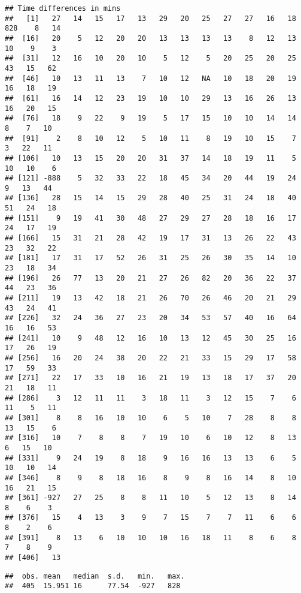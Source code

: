 \documentclass[
]{article}
\begin{document}
\begin{verbatim}
## Time differences in mins
##   [1]   27   14   15   17   13   29   20   25   27   27   16   18  828    8   14
##  [16]   20    5   12   20   20   13   13   13   13    8   12   13   10    9    3
##  [31]   12   16   10   20   10    5   12    5   20   25   20   25   43   15   62
##  [46]   10   13   11   13    7   10   12   NA   10   18   20   19   16   18   19
##  [61]   16   14   12   23   19   10   10   29   13   16   26   13   16   20   15
##  [76]   18    9   22    9   19    5   17   15   10   10   14   14    8    7   10
##  [91]    2    8   10   12    5   10   11    8   19   10   15    7    3   22   11
## [106]   10   13   15   20   20   31   37   14   18   19   11    5   10   10    6
## [121] -888    5   32   33   22   18   45   34   20   44   19   24    9   13   44
## [136]   28   15   14   15   29   28   40   25   31   24   18   40   51   24   18
## [151]    9   19   41   30   48   27   29   27   28   18   16   17   24   17   19
## [166]   15   31   21   28   42   19   17   31   13   26   22   43   23   32   22
## [181]   17   31   17   52   26   31   25   26   30   35   14   10   23   18   34
## [196]   26   77   13   20   21   27   26   82   20   36   22   37   44   23   36
## [211]   19   13   42   18   21   26   70   26   46   20   21   29   43   24   41
## [226]   32   24   36   27   23   20   34   53   57   40   16   64   16   16   53
## [241]   10    9   48   12   16   10   13   12   45   30   25   16   17   26   19
## [256]   16   20   24   38   20   22   21   33   15   29   17   58   17   59   33
## [271]   22   17   33   10   16   21   19   13   18   17   37   20   21   18   11
## [286]    3   12   11   11    3   18   11    3   12   15    7    6   11    5   11
## [301]    8    8   16   10   10    6    5   10    7   28    8    8   13   15    6
## [316]   10    7    8    8    7   19   10    6   10   12    8   13    6   15   10
## [331]    9   24   19    8   18    9   16   16   13   13    6    5   10   10   14
## [346]    8    9    8   18   16    8    9    8   16   14    8   10   16   21   15
## [361] -927   27   25    8    8   11   10    5   12   13    8   14    8    6    3
## [376]   15    4   13    3    9    7   15    7    7   11    6    6    8    2    6
## [391]    8   13    6   10   10   10   16   18   11    8    6    8    7    8    9
## [406]   13
\end{verbatim}

\begin{verbatim}
##  obs. mean   median  s.d.   min.   max.  
##  405  15.951 16      77.54  -927   828
\end{verbatim}
\end{document}
